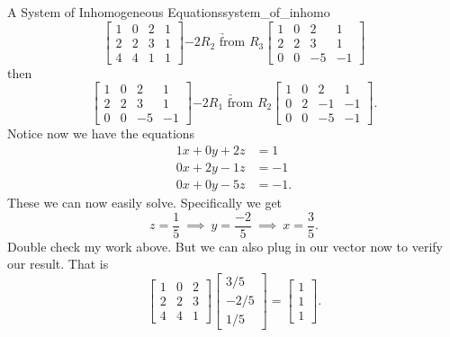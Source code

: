 \begin{ex}{A System of Inhomogeneous Equations}{system_of_inhomo}
        \[
        \left[\begin{array}{ccc|c}
        1 & 0 & 2 & 1 \\
        2 & 2 & 3 & 1 \\
        4 & 4 & 1 & 1
        \end{array}\right] \underrightarrow{-2 R_2 \textrm{ from } R_3} 
        \left[\begin{array}{ccc|c}
        1 & 0 & 2 & 1 \\
        2 & 2 & 3 & 1 \\
        0 & 0 & -5 & -1
        \end{array}\right]
        \]
        then
        \[
        \left[\begin{array}{ccc|c}
        1 & 0 & 2 & 1 \\
        2 & 2 & 3 & 1 \\
        0 & 0 & -5 & -1
        \end{array}\right] \underrightarrow{-2 R_1 \textrm{ from } R_2} 
        \left[\begin{array}{ccc|c}
        1 & 0 & 2 & 1 \\
        0 & 2 & -1 & -1 \\
        0 & 0 & -5 & -1
        \end{array}\right]   .     
        \]
        Notice now we have the equations
        \begin{align*}
            1x+0y+2z&=1\\
            0x+2y-1z&=-1\\
            0x+0y-5z&=-1.
        \end{align*}
        These we can now easily solve.  Specifically we get
        \[
        z=\frac{1}{5} ~\implies~ y=\frac{-2}{5} ~\implies~ x=\frac{3}{5}. 
        \]
        Double check my work above.  But we can also plug in our vector now to verify our result.  That is
        \[
        \begin{bmatrix}
        1 & 0 & 2\\
        2 & 2 & 3\\
        4 & 4 & 1
        \end{bmatrix}
        \begin{bmatrix}
        3/5\\
        -2/5\\
        1/5
        \end{bmatrix}
        =\begin{bmatrix}
        1\\
        1\\
        1
        \end{bmatrix}.        
        \]
        \end{ex}
        
